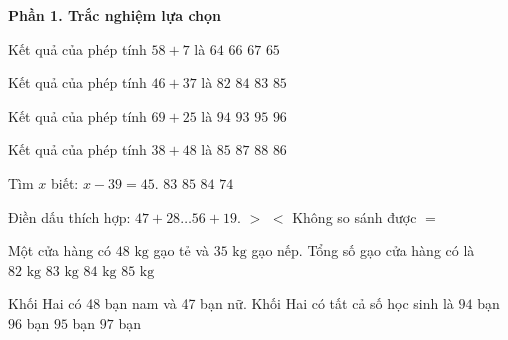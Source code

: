 \textbf{Phần 1. Trắc nghiệm lựa chọn}

\begin{ex} %
Kết quả của phép tính $58 + 7$ là
\choice
{$64$}
{$66$}
{$67$}
{\True $65$}
\end{ex}

\begin{ex} %
Kết quả của phép tính $46 + 37$ là
\choice
{$82$}
{$84$}
{\True $83$}
{$85$}
\end{ex}

\begin{ex} %
Kết quả của phép tính $69 + 25$ là
\choice
{\True $94$}
{$93$}
{$95$}
{$96$}
\end{ex}

\begin{ex} %
Kết quả của phép tính $38 + 48$ là
\choice
{$85$}
{$87$}
{$88$}
{\True $86$}
\end{ex}

\begin{ex} %
Tìm $x$ biết: $x - 39 = 45$.
\choice
{$83$}
{$85$}
{\True $84$}
{$74$}
\end{ex}

\begin{ex} %
Điền dấu thích hợp: $47 + 28 \dots 56 + 19$.
\choice
{$>$}
{$<$}
{Không so sánh được}
{\True $=$}
\end{ex}

\begin{ex} %
Một cửa hàng có $48\text{ kg}$ gạo tẻ và $35\text{ kg}$ gạo nếp. Tổng số gạo cửa hàng có là
\choice
{$82\text{ kg}$}
{\True $83\text{ kg}$}
{$84\text{ kg}$}
{$85\text{ kg}$}
\end{ex}

\begin{ex} %
Khối Hai có 48 bạn nam và 47 bạn nữ. Khối Hai có tất cả số học sinh là
\choice
{$94$ bạn}
{$96$ bạn}
{\True $95$ bạn}
{$97$ bạn}
\end{ex}


